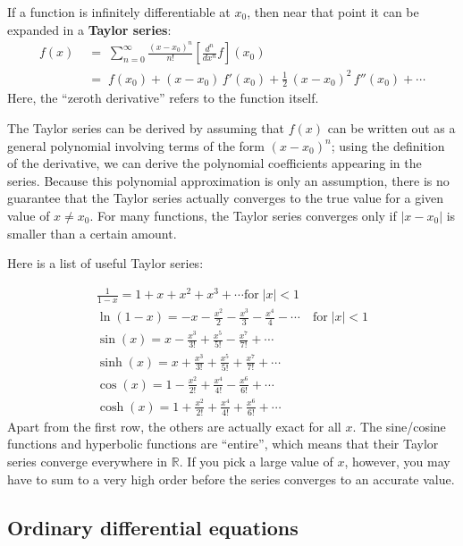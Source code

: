 \documentclass[10pt,a4paper]{article}
\begin{document}
If a function is infinitely differentiable at $x_0$, then near that
point it can be expanded in a \textbf{Taylor series}:
\begin{equation}
\begin{aligned}f(x) \;&=\; \sum_{n=0}^\infty \frac{(x-x_0)^n}{n!} \left[\frac{d^n}{dx^n} f\right](x_0) \\&=\; f(x_0) + (x-x_0)\, f'(x_0) + \frac{1}{2}\, (x-x_0)^2\, f''(x_0) + \cdots\end{aligned}
\end{equation}
Here, the ``zeroth derivative'' refers to the function itself.

The Taylor series can be derived by assuming that $f(x)$ can be
written out as a general polynomial involving terms of the form
$(x-x_0)^n$; using the definition of the derivative, we can derive the
polynomial coefficients appearing in the series. Because this polynomial
approximation is only an assumption, there is no guarantee that the
Taylor series actually converges to the true value for a given value of
$x \ne x_0$. For many functions, the Taylor series converges only if
$|x-x_0|$ is smaller than a certain amount.

\pagebreak
Here is a list of useful Taylor series:

\begin{align}
  \frac{1}{1-x} = 1 + x + x^2 + x^3 + \cdots\mathrm{for} \; |x| < 1 \\
  \ln(1-x) = -x - \frac{x^2}{2} - \frac{x^3}{3} - \frac{x^4}{4} - \cdots \quad \mathrm{for} \; |x| < 1 \\
  \sin(x) = x - \frac{x^3}{3!} + \frac{x^5}{5!} - \frac{x^7}{7!} + \cdots \\
  \sinh(x) = x + \frac{x^3}{3!} + \frac{x^5}{5!} + \frac{x^7}{7!} + \cdots \\
  \cos(x) = 1 - \frac{x^2}{2!} + \frac{x^4}{4!} - \frac{x^6}{6!} + \cdots \\
  \cosh(x) = 1 + \frac{x^2}{2!} + \frac{x^4}{4!} + \frac{x^6}{6!} + \cdots
\end{align}
Apart from the first row, the others are actually exact for all $x$.
The sine/cosine functions and hyperbolic functions are ``entire'',
which means that their Taylor series converge everywhere in
$\mathbb{R}$. If you pick a large value of $x$, however, you may have
to sum to a very high order before the series converges to an accurate
value.

\subsection{Ordinary differential equations}
\label{ordinary-differential-equations}
\end{document}
